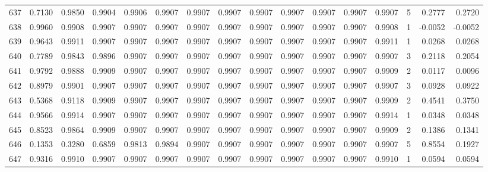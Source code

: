 \begin{tabular}{lrrrrrrrrrrrrrrr}
637 &      0.7130 &  0.9850 &  0.9904 &  0.9906 &  0.9907 &  0.9907 &  0.9907 &  0.9907 &  0.9907 &  0.9907 &   0.9907 &     0.9907 &      5 &                    0.2777 &                     0.2720 \\
638 &      0.9960 &  0.9908 &  0.9907 &  0.9907 &  0.9907 &  0.9907 &  0.9907 &  0.9907 &  0.9907 &  0.9907 &   0.9907 &     0.9908 &      1 &                   -0.0052 &                    -0.0052 \\
639 &      0.9643 &  0.9911 &  0.9907 &  0.9907 &  0.9907 &  0.9907 &  0.9907 &  0.9907 &  0.9907 &  0.9907 &   0.9907 &     0.9911 &      1 &                    0.0268 &                     0.0268 \\
640 &      0.7789 &  0.9843 &  0.9896 &  0.9907 &  0.9907 &  0.9907 &  0.9907 &  0.9907 &  0.9907 &  0.9907 &   0.9907 &     0.9907 &      3 &                    0.2118 &                     0.2054 \\
641 &      0.9792 &  0.9888 &  0.9909 &  0.9907 &  0.9907 &  0.9907 &  0.9907 &  0.9907 &  0.9907 &  0.9907 &   0.9907 &     0.9909 &      2 &                    0.0117 &                     0.0096 \\
642 &      0.8979 &  0.9901 &  0.9907 &  0.9907 &  0.9907 &  0.9907 &  0.9907 &  0.9907 &  0.9907 &  0.9907 &   0.9907 &     0.9907 &      3 &                    0.0928 &                     0.0922 \\
643 &      0.5368 &  0.9118 &  0.9909 &  0.9907 &  0.9907 &  0.9907 &  0.9907 &  0.9907 &  0.9907 &  0.9907 &   0.9907 &     0.9909 &      2 &                    0.4541 &                     0.3750 \\
644 &      0.9566 &  0.9914 &  0.9907 &  0.9907 &  0.9907 &  0.9907 &  0.9907 &  0.9907 &  0.9907 &  0.9907 &   0.9907 &     0.9914 &      1 &                    0.0348 &                     0.0348 \\
645 &      0.8523 &  0.9864 &  0.9909 &  0.9907 &  0.9907 &  0.9907 &  0.9907 &  0.9907 &  0.9907 &  0.9907 &   0.9907 &     0.9909 &      2 &                    0.1386 &                     0.1341 \\
646 &      0.1353 &  0.3280 &  0.6859 &  0.9813 &  0.9894 &  0.9907 &  0.9907 &  0.9907 &  0.9907 &  0.9907 &   0.9907 &     0.9907 &      5 &                    0.8554 &                     0.1927 \\
647 &      0.9316 &  0.9910 &  0.9907 &  0.9907 &  0.9907 &  0.9907 &  0.9907 &  0.9907 &  0.9907 &  0.9907 &   0.9907 &     0.9910 &      1 &                    0.0594 &                     0.0594 \\

\end{tabular}

